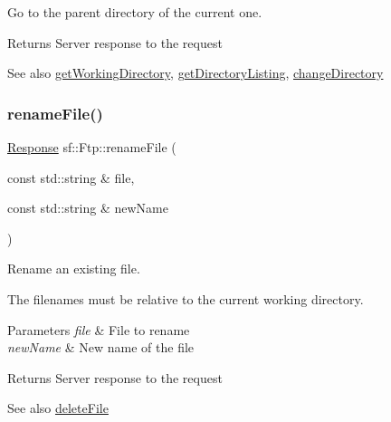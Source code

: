 Go to the parent directory of the current one. 

\begin{DoxyReturn}{Returns}
Server response to the request
\end{DoxyReturn}
\begin{DoxySeeAlso}{See also}
\mbox{\hyperlink{classsf_1_1_ftp_a79c654fcdd0c81e68c4fa29af3b45e0c}{get\+Working\+Directory}}, \mbox{\hyperlink{classsf_1_1_ftp_a8f37258e461fcb9e2a0655e9df0be4a0}{get\+Directory\+Listing}}, \mbox{\hyperlink{classsf_1_1_ftp_a7e93488ea6330dd4dd76e428da9bb6d3}{change\+Directory}} \begin{DoxyVerb}\end{DoxyVerb}
 
\end{DoxySeeAlso}
\mbox{\label{classsf_1_1_ftp_a8f99251d7153e1dc26723e4006deb764}} 
\subsubsection{\texorpdfstring{renameFile()}{renameFile()}}
{\footnotesize\ttfamily \mbox{\hyperlink{classsf_1_1_ftp_1_1_response}{Response}} sf\+::\+Ftp\+::rename\+File (\begin{DoxyParamCaption}\item[{const std\+::string \&}]{file,  }\item[{const std\+::string \&}]{new\+Name }\end{DoxyParamCaption})}



Rename an existing file. 

The filenames must be relative to the current working directory.


\begin{DoxyParams}{Parameters}
{\em file} & File to rename \\
\hline
{\em new\+Name} & New name of the file\\
\hline
\end{DoxyParams}
\begin{DoxyReturn}{Returns}
Server response to the request
\end{DoxyReturn}
\begin{DoxySeeAlso}{See also}
\mbox{\hyperlink{classsf_1_1_ftp_a8aa272b0eb7769a850006e70fcad370f}{delete\+File}} \begin{DoxyVerb}\end{DoxyVerb}
 
\end{DoxySeeAlso}
\mbox{\label{classsf_1_1_ftp_a44e095103ecbce175a33eaf0820440ff}} 
